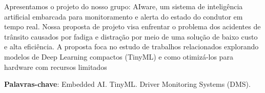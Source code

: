 \documentclass[
	12pt,				%
	openright,			%
	oneside,			%
	a4paper,			%
	english,			%
	english				%
	]{abntex2}
\begin{document}






\setlength{\absparsep}{18pt} %
\begin{resumo}[Resumo]
Apresentamos o projeto do nosso grupo: AIware, um sistema de inteligência artificial embarcada para monitoramento e alerta do estado do condutor em tempo real. Nossa proposta de projeto visa enfrentar o problema dos acidentes de trânsito causados por fadiga e distração por meio de uma solução de baixo custo e alta eficiência. A proposta foca no estudo de trabalhos relacionados explorando modelos de Deep Learning compactos (TinyML) e como otimizá-los para hardware com recursos limitados

 \textbf{Palavras-chave}: Embedded AI. TinyML. Driver Monitoring Systems (DMS).
\end{resumo}
\end{document}
